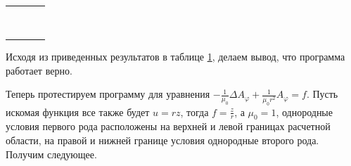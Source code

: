 \begin{table}
\begin{tabularx}{1.0\textwidth}{| >{\raggedright\arraybackslash}X | >{\raggedright\arraybackslash}X | >{\raggedright\arraybackslash}X |>{\raggedright\arraybackslash}X |}
		 \centering{(20,0008; -80)} & \centering{-1.60091687E+003}& \centering{8.52871444E-001} & \centering{5.33023331E-004} \tabularnewline \hline
		 \centering{(40,0006; -80)} & \centering{-3.20206687E+003} & \centering{2.01886922E+000} & \centering{6.30887168E-004} \tabularnewline \hline
 		 \centering{(60,0004; -80)} & \centering{-4.80177546E+003} & \centering{1.74346432E+000} & \centering{3.63219313E-004} \tabularnewline \hline
		 \centering{(80,0002; -80)} & \centering{-6.40714832E+003} & \centering{7.13231677E+000} & \centering{1.11442171E-003} \tabularnewline \hline
		 \centering{(100; -80)} & \centering{-7.99078772E+003} & \centering{9.21228366E+000} & \centering{1.15153546E-003} \tabularnewline \hline
		 
		 \centering{(20,0008; -100)} & \centering{-1.99661901E+003}& \centering{3.46099134E+000} & \centering{1.73042645E-003} \tabularnewline \hline
		 \centering{(40,0006; -100)} & \centering{-3.99352786E+003} & \centering{6.53213746E+000} & \centering{1.63300987E-003} \tabularnewline \hline
  		 \centering{(60,0004; -100)} & \centering{-5.98864281E+003} & \centering{1.13971859E+001} & \centering{1.89951832E-003} \tabularnewline \hline
		 \centering{(80,0002; -100)} & \centering{-9.96592479E+003} & \centering{9.21283395E+000} & \centering{1.15160136E-003} \tabularnewline \hline
		 \centering{(100; -100)} & \centering{-9.96592479E+003} & \centering{3.40752140E+001} & \centering{3.40752140E-003} \tabularnewline \hline
		 
 	\end{tabularx}
	\label{tab:test1}
\end{table}

Исходя из приведенных результатов в таблице \ref{tab:test1}, делаем вывод, что программа работает верно.

\newpage

Теперь протестируем программу для уравнения $-\frac{1}{\mu_0} \Delta A_{\varphi} + \frac{1}{\mu_0 r^2} A_{\varphi} = f$. Пусть искомая функция все также будет $u = rz$, тогда $f = \frac{z}{r}$, а  $\mu_0 = 1$, однородные условия первого рода расположены на верхней и левой границах расчетной области, на правой и нижней границе условия однородные второго рода. Получим следующее.  

